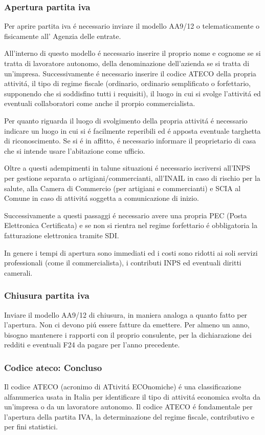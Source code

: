\documentclass{article}
\begin{document}
\subsubsection{Apertura partita iva}
Per aprire partita iva \'e necessario inviare il modello AA9/12 o telematicamente o fisicamente all' Agenzia delle entrate. 

All'interno di questo modello \'e necessario inserire il proprio nome e cognome se si tratta di lavoratore autonomo, della denominazione dell'azienda se si tratta di un'impresa. Successivamente \'e necessario inserire il codice ATECO della propria attivit\'a, il tipo di regime fiscale (ordinario, ordinario semplificato o forfettario, supponendo che si soddisfino tutti i requisiti), il luogo in cui si svolge l'attivit\'a ed eventuali collaboratori come anche il prorpio commercialista.

Per quanto riguarda il luogo di svolgimento della propria attivit\'a \'e necessario indicare un luogo in cui si \'e facilmente reperibili ed \'e apposta eventuale targhetta di riconoscimento. Se si \'e in affitto, \'e necessario informare il proprietario di casa che si intende usare l'abitazione come ufficio.

Oltre a questi adempimenti in talune situazioni \'e necessario iscriversi all'INPS per gestione separata o artigiani/commercianti, all'INAIL in caso di rischio per la salute, alla Camera di Commercio (per artigiani e commercianti) e SCIA al Comune in caso di  attivit\'a soggetta a comunicazione di inizio.

Successivamente a questi passaggi \'e necessario avere una propria PEC (Posta Elettronica Certificata) e se non si rientra nel regime forfettario \'e obbligatoria la fatturazione elettronica tramite SDI. 

In genere i tempi di apertura sono immediati ed i costi sono ridotti ai soli servizi professionali (come il commercialista), i contributi INPS ed eventuali diritti camerali.

\subsubsection{Chiusura partita iva}
Inviare il modello AA9/12 di chiusura, in maniera analoga a quanto fatto per l'apertura. Non ci devono pi\'u essere fatture da emettere. Per almeno un anno, bisogno mantenere i rapporti con il proprio consulente, per la dichiarazione dei redditi e eventuali F24 da pagare per l'anno precedente.
\subsubsection{Codice ateco: Concluso}
Il codice ATECO (acronimo di ATtivit\'a ECOnomiche) \'e una classificazione alfanumerica usata in Italia per identificare il tipo di attivit\'a economica svolta da un'impresa o da un lavoratore autonomo. Il codice ATECO \'e fondamentale per l'apertura della partita IVA, la determinazione del regime fiscale, contributivo e per fini statistici. 
\end{document}
